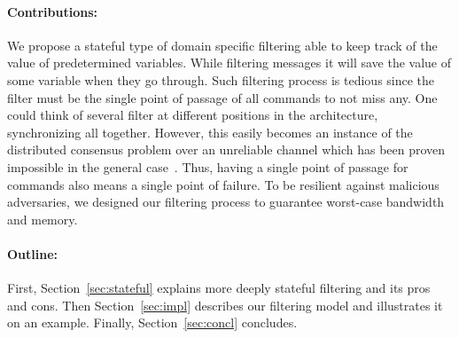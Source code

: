 \paragraph{Contributions:} We propose a stateful type of domain specific
filtering able to keep track of the value of predetermined variables.
While filtering messages it will save the value of some variable when they go
through.
Such filtering process is tedious since the filter must be the single point of
passage of all commands to not miss any.
One could think of several filter at different positions in the architecture,
synchronizing all together.
However, this easily becomes an instance of the distributed consensus problem
over an unreliable channel which has been proven impossible in the general
case~\cite{FLP85}.
Thus, having a single point of passage for commands also means a single point of
failure.
To be resilient against malicious adversaries, we designed our filtering process
to guarantee worst-case bandwidth and memory.


\paragraph{Outline:} First, Section~\ref{sec:stateful} explains more deeply
stateful filtering and its pros and cons.
Then Section~\ref{sec:impl} describes our filtering model and illustrates it on
an example.
Finally, Section~\ref{sec:concl} concludes.
